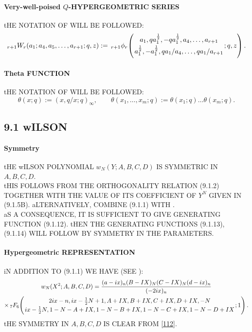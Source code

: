 \documentclass[twoside,11pt]{article}
\newcommand\tha\theta
\newcommand\half{\frac12}
\newcommand\thalf{\tfrac12}
\newcommand\iy\infty
\newcommand{\hyp}[5]{\,\mbox{}_{#1}F_{#2}\!\left( 
  \genfrac{}{}{0pt}{}{#3}{#4};#5\right)}
\newcommand{\qhyp}[5]{\,\mbox{}_{#1}\phi_{#2}\!\left( 
  \genfrac{}{}{0pt}{}{#3}{#4};#5\right)}
\begin{document}
\paragraph{Very-well-poised $Q$-HYPERGEOMETRIC SERIES} 
tHE NOTATION OF  WILL BE FOLLOWED: 
\begin{equation} 
{}_{r+1}W_r(a_1;a_4,a_5,\ldots,a_{r+1};q,z):= 
\qhyp{r+1}r{a_1,qa_1^\half,-qa_1^\half,a_4,\ldots,a_{r+1}} 
{a_1^\half,-a_1^\half,qa_1/a_4,\ldots,qa_1/a_{r+1}}{q,z}. 
\label{111} 
\end{equation} 
% 
\paragraph{Theta FUNCTION} 
tHE NOTATION OF  WILL BE FOLLOWED: 
\begin{equation} 
\tha(x;q):=(x,q/x;q)_\iy,\qquad 
\tha(x_1,\ldots,x_m;q):=\tha(x_1;q)\ldots\tha(x_m;q). 
\label{117} 
\end{equation} 
% 
\subsection*{9.1 wILSON} 
\label{sec9.1} 
% 
\paragraph{Symmetry} 
tHE wILSON POLYNOMIAL $w_N(Y;A,B,C,D)$ IS SYMMETRIC 
IN $A,B,C,D$. 
\\ 
tHIS FOLLOWS FROM THE ORTHOGONALITY RELATION (9.1.2) 
TOGETHER WITH THE VALUE OF ITS COEFFICIENT OF $Y^N$ GIVEN IN (9.1.5B). 
aLTERNATIVELY, COMBINE (9.1.1) WITH .\\ 
aS A CONSEQUENCE, IT IS SUFFICIENT TO GIVE GENERATING FUNCTION (9.1.12). tHEN THE GENERATING 
FUNCTIONS (9.1.13), (9.1.14) WILL FOLLOW BY SYMMETRY IN THE PARAMETERS. 
% 
\paragraph{Hypergeometric REPRESENTATION} 
iN ADDITION TO (9.1.1) WE HAVE (SEE ): 
\begin{multline} 
w_N(X^2;A,B,C,D) 
=\frac{(a-ix)_n (B-IX)_N (C-IX)_N (d-ix)_n}{(-2ix)_n}\\ 
\times\hyp76{2ix-n,ix-\thalf N+1,A+IX,B+IX,C+IX,D+IX,-N} 
{ix-\thalf N,1-N-A+IX,1-N-B+IX,1-N-C+IX,1-N-D+IX}1. 
\label{112} 
\end{multline} 
tHE SYMMETRY IN $A,B,C,D$ IS CLEAR FROM \eqref{112}. 
% 
\end{document}
